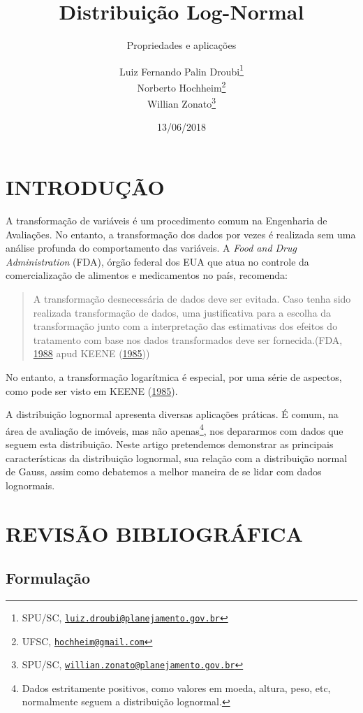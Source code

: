 \documentclass[a4paper]{article}
\title{Distribuição Log-Normal}
\subtitle{Propriedades e aplicações}
\author{Luiz Fernando Palin Droubi\footnote{SPU/SC,
  \href{mailto:luiz.droubi@planejamento.gov.br}{\nolinkurl{luiz.droubi@planejamento.gov.br}}} \\ Norberto Hochheim\footnote{UFSC,
  \href{mailto:hochheim@gmail.com}{\nolinkurl{hochheim@gmail.com}}} \\ Willian Zonato\footnote{SPU/SC,
  \href{mailto:willian.zonato@planejamento.gov.br}{\nolinkurl{willian.zonato@planejamento.gov.br}}}}
\date{13/06/2018}
\let\rmarkdownfootnote\footnote%
\def\footnote{\protect\rmarkdownfootnote}
\begin{document}
\maketitle

\section{INTRODUÇÃO}\label{introducao}

A transformação de variáveis é um procedimento comum na Engenharia de
Avaliações. No entanto, a transformação dos dados por vezes é realizada
sem uma análise profunda do comportamento das variáveis. A \emph{Food
and Drug Administration} (FDA), órgão federal dos EUA que atua no
controle da comercialização de alimentos e medicamentos no país,
recomenda:

\begin{quote}
A transformação desnecessária de dados deve ser evitada. Caso tenha sido
realizada transformação de dados, uma justificativa para a escolha da
transformação junto com a interpretação das estimativas dos efeitos do
tratamento com base nos dados transformados deve ser fornecida.(FDA,
\protect\hyperlink{ref-fda}{1988} apud KEENE
(\protect\hyperlink{ref-keene}{1985}))
\end{quote}

No entanto, a transformação logarítmica é especial, por uma série de
aspectos, como pode ser visto em KEENE
(\protect\hyperlink{ref-keene}{1985}).

A distribuição lognormal apresenta diversas aplicações práticas. É
comum, na área de avaliação de imóveis, mas não apenas\footnote{Dados
  estritamente positivos, como valores em moeda, altura, peso, etc,
  normalmente seguem a distribuição lognormal.}, nos depararmos com
dados que seguem esta distribuição. Neste artigo pretendemos demonstrar
as principais características da distribuição lognormal, sua relação com
a distribuição normal de Gauss, assim como debatemos a melhor maneira de
se lidar com dados lognormais.

\section{REVISÃO BIBLIOGRÁFICA}\label{revisao-bibliografica}

\subsection{Formulação}\label{formulacao}
\end{document}
